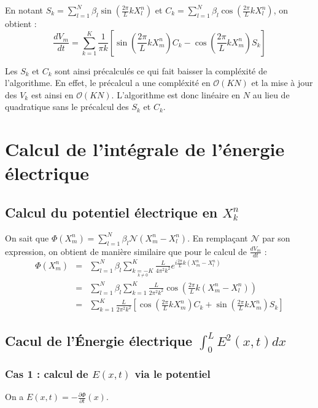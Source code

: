 \documentclass[a4paper,11pt]{article}
\begin{document}
En notant $S_k = \sum\limits_{l=1}^N \beta_l \sin(\frac{2 \pi}{L}kX_l^n)$ et $C_k = \sum\limits_{l=1}^N \beta_l \cos(\frac{2 \pi}{L}kX_l^n)$, on obtient :
$$
\frac{d V_m} {dt} = \sum\limits_{k=1}^K \frac{1}{ \pi k} [\sin (\frac{2 \pi}{L} kX_m^n)C_k - \cos(\frac{2 \pi}{L} kX_m^n)S_k]
$$

Les $S_k$ et $C_k$ sont ainsi précalculés ce qui fait baisser la compléxité de l'algorithme. En effet, le précalcul a une compléxité en $\mathcal{O}(KN)$ et la mise à jour des $V_k$ est ainsi en $\mathcal{O}(KN)$. L'algorithme est donc linéaire en $N$ au lieu de quadratique sans le précalcul des $S_k$ et $C_k$.

\section{Calcul de l'intégrale de l'énergie électrique}

\subsection{Calcul du potentiel électrique en $X_k^n$}

On sait que $\Phi (X_m^n) = \sum\limits_{l=1}^N \beta_l \mathcal{N}(X_m^n - X_l^n)$. En remplaçant $\mathcal{N}$ par son expression, on obtient de manière similaire que pour le calcul de $\frac{dV_m}{dt}$ :
$$
\begin{array}{rcl}
\Phi (X_m^n) &=& \sum\limits_{l=1}^N \beta_l \sum\limits_{\underset{k \neq 0}{k=-K}}^K \frac{L}{4 \pi^2 k^2}  e^{i\frac{2 \pi}{L} k(X_m^n - X_l^n)} \\
 &=& \sum\limits_{l=1}^N \beta_l \sum\limits_{k=1}^K \frac{L}{2 \pi^2 k^2}  \cos (\frac{2 \pi}{L} k(X_m^n - X_l^n)) \\
 &=& \sum\limits_{k=1}^K \frac{L}{2 \pi^2 k^2} [\cos (\frac{2 \pi}{L} kX_m^n)C_k + \sin(\frac{2 \pi}{L} kX_m^n)S_k]
\end{array}
$$

\subsection{Cacul de l'Énergie électrique $\int_{0}^{L} E^2(x,t)dx$}
\label{energy}

\subsubsection{Cas 1 : calcul de $E(x,t)$ via le potentiel}
\label{energy pot}

On a $E(x,t) = - \frac{\partial \Phi}{\partial t}(x)$.
\end{document}
